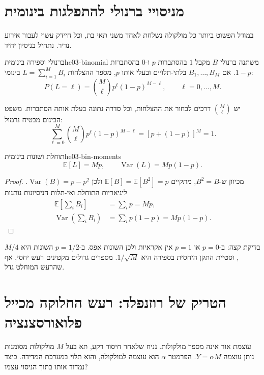 \section{מניסויי ברנולי להתפלגות בינומית}\label{sec:he03-binomial}
במודל הפשוט ביותר כל מולקולה נשלחת לאחד משני תאי בת, וכל חיידק עשוי לעבור אירוע נדיר. נתחיל בניסיון יחיד.
\begin{definition}{ברנולי וספירה בינומית}{he03-binomial}
משתנה ברנולי $B$ מקבל $1$ בהסתברות $p$ ו-$0$ בהסתברות $1-p$. אם $B_1,\ldots,B_M$ בלתי-תלויים ובעלי אותו $p$, מספר ההצלחות $L=\sum_{i=1}^M B_i$ בינומי:
\begin{equation}\label{eq:he03-binomial}
P(L=\ell)=\binom{M}{\ell}p^\ell(1-p)^{M-\ell},\qquad \ell=0,\ldots,M.
\end{equation}
\end{definition}
יש $\binom{M}{\ell}$ דרכים לבחור את ההצלחות, וכל סדרה נתונה בעלת אותה הסתברות. משפט הבינום מבטיח נרמול:
\begin{equation}\label{eq:he03-bin-normalization}
\sum_{\ell=0}^M\binom{M}{\ell}p^\ell(1-p)^{M-\ell}=[p+(1-p)]^M=1.
\end{equation}

\begin{proposition}{תוחלת ושונות בינומית}{he03-bin-moments}
\begin{equation}\label{eq:he03-bin-moments}
\mathbb{E}[L]=Mp,\qquad \operatorname{Var}(L)=Mp(1-p).
\end{equation}
\end{proposition}
\begin{proof}
מכיוון ש-$B^2=B$, מתקיים $\mathbb{E}[B]=\mathbb{E}[B^2]=p$ ולכן $\operatorname{Var}(B)=p-p^2$. ליניאריות התוחלת ואי-תלות הניסיונות נותנות
\begin{align}
\mathbb{E}\!\left[\sum_iB_i\right]&=\sum_i p=Mp,\label{eq:he03-bin-mean-proof}\\
\operatorname{Var}\!\left(\sum_iB_i\right)&=\sum_i p(1-p)=Mp(1-p).\label{eq:he03-bin-var-proof}
\end{align}
\end{proof}
בדיקת קצה: ב-$p=0$ או $p=1$ אין אקראיות ולכן השונות אפס. ב-$p=1/2$ השונות היא $M/4$, וסטיית התקן היחסית בספירה היא $1/\sqrt M$. מספרים גדולים מקטינים רעש יחסי, אף שהרעש המוחלט גדל.

\section{הטריק של רוזנפלד: רעש החלוקה מכייל פלואורסצנציה}\label{sec:he03-rosenfeld}
עוצמת אור אינה מספר מולקולות. נניח שלאחר חיסור רקע, תא בעל $M$ מולקולות מסומנות נותן עוצמה $Y=\alpha M$. הפרמטר $\alpha$ הוא עוצמה למולקולה, והוא תלוי במערכת המדידה. כיצד נמדוד אותו בתוך הניסוי עצמו?

